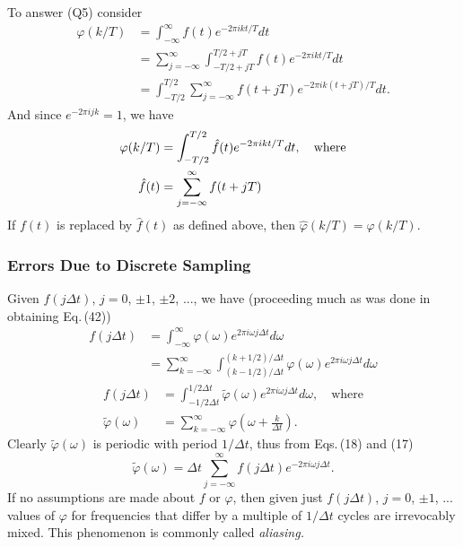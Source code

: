 \documentclass[twoside]{MATH77}
\begin{document}
To answer (Q5) consider%
\begin{equation*}
\begin{split}
\varphi (k/T)&=\int_{-\infty }^\infty f(t)e^{-2\pi ikt/T}dt\\
&=\sum_{j=-\infty}^\infty \int_{-T/2+jT}^{T/2+jT}f(t)e^{-2\pi ikt/T}dt\\
&=\int_{-T/2}^{T/2}\sum_{j=-\infty }^\infty f(t+jT)e^{-2\pi ik(t+jT)/T}dt.
\end{split}
\end{equation*}
And since $e^{-2\pi ijk}=1$, we have
\begin{equation}\label{O43}
\begin{split}
\varphi (k/T)&=\int_{-T/2}^{T/2}\hat f(t)e^{-2\pi ikt/T}dt, \quad
\text{where}\vspace{4pt} \\
\hat f(t)&=\sum_{j=-\infty }^\infty f(t+jT)
\end{split}
\end{equation}
If $f(t)$ is replaced by $\hat f(t)$ as defined above, then $\hat \varphi
(k/T)=\varphi (k/T).$

\subsubsection{Errors Due to Discrete Sampling}

Given $f(j\Delta t)$, $j=0$, $\pm 1$, $\pm 2$, ..., we have (proceeding much
as was done in obtaining Eq.\,(42))%
\begin{equation*}
\begin{split}
f(j\Delta t)&=\int_{-\infty }^\infty \varphi (\omega )e^{2\pi
i\omega j\Delta t}d\omega\\
&=\sum_{k=-\infty }^\infty \int_{(k-1/2)/\Delta
t}^{(k+1/2)/\Delta t}\varphi (\omega )e^{2\pi i\omega j\Delta t}d\omega
\end{split}
\end{equation*}
\begin{equation}\label{O44}
\begin{split}
f(j\Delta t)&=\int_{-1/2\Delta t}^{1/2\Delta t}\tilde \varphi
(\omega )e^{2\pi i\omega j\Delta t}d\omega ,\quad \text{where}\\
\tilde \varphi (\omega )&=\sum_{k=-\infty }^\infty \varphi (\omega
+\frac k{\Delta t}).
\end{split}
\end{equation}
Clearly $\tilde \varphi (\omega )$ is periodic with period $1/\Delta t$,
thus from Eqs.\,(18) and (17)
\begin{equation}\label{O45}
\tilde \varphi (\omega )=\Delta t\sum_{j=-\infty }^\infty f(j\Delta
t)e^{-2\pi i\omega j\Delta t}.
\end{equation}
If no assumptions are made about $f$ or $\varphi $, then given just
$f(j\Delta t)$, $j=0$, $\pm 1$, ... values of $\varphi $ for
frequencies that differ by a multiple of $1/\Delta t$ cycles are
irrevocably mixed. This phenomenon is commonly called {\em aliasing.}
\end{document}
